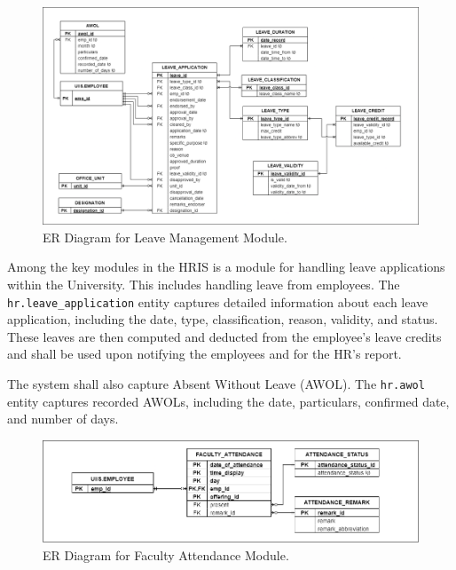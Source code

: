    \begin{figure}[H]
        \centering
        \includegraphics[width=1\linewidth]{figures/images/diagrams/erd/erd-leavesys-employee-leave.png}
        \caption{ER Diagram for Leave Management Module.}
        \label{fig:erd-leavesys-employee-leave}
    \end{figure}

    Among the key modules in the HRIS is a module for handling leave applications within the University. This includes handling leave from employees. The \texttt{hr.leave\_application} entity captures detailed information about each leave application, including the date, type, classification, reason, validity, and status. These leaves are then computed and deducted from the employee's leave credits and shall be used upon notifying the employees and for the HR's report.

    The system shall also capture Absent Without Leave (AWOL). The \texttt{hr.awol} entity captures recorded AWOLs, including the date, particulars, confirmed date, and number of days.

    \begin{figure}[H]
        \centering
        \includegraphics[width=1\linewidth]{figures/images/diagrams/erd/erd-facsys-faculty-attendance.png}
        \caption{ER Diagram for Faculty Attendance Module.}
        \label{fig:erd-facsys-faculty-attendance}
    \end{figure}

